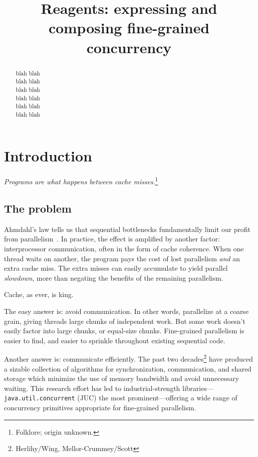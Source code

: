 \documentclass[preprint]{sigplanconf}
\begin{document}
\authorinfo{}{}{}

\title{Reagents: expressing and composing fine-grained concurrency}
\maketitle

\begin{abstract}
blah blah\\
blah blah\\
blah blah\\
blah blah\\
blah blah\\
blah blah
\end{abstract}

\section{Introduction}

\emph{Programs are what happens between cache
  misses}.\footnote{Folklore; origin unknown.}

\subsection*{The problem}

Ahmdahl's law tells us that sequential bottlenecks fundamentally limit our
profit from parallelism~\cite{?}.  In practice, the effect is amplified by
another factor: interprocessor communication, often in the form of cache
coherence.  When one thread waits on another, the program pays the cost of
lost parallelism \emph{and} an extra cache miss.  The extra misses can easily
accumulate to yield parallel \emph{slowdown}, more than negating the benefits
of the remaining parallelism.

Cache, as ever, is king.

The easy answer is: avoid communication.  In other words, parallelize at a
coarse grain, giving threads large chunks of independent work.  But some work
doesn't easily factor into large chunks, or equal-size chunks.  Fine-grained
parallelism is easier to find, and easier to sprinkle throughout existing
sequential code.

Another answer is: communicate efficiently.  The past two
decades\footnote{Herlihy/Wing, Mellor-Crummey/Scott} have produced a sizable
collection of algorithms for synchronization, communication, and shared
storage which minimize the use of memory bandwidth and avoid unnecessary
waiting.  This research effort has led to industrial-strength
libraries---\texttt{java.util.concurrent} (JUC) the most prominent---offering
a wide range of concurrency primitives appropriate for fine-grained
parallelism.
\end{document}
